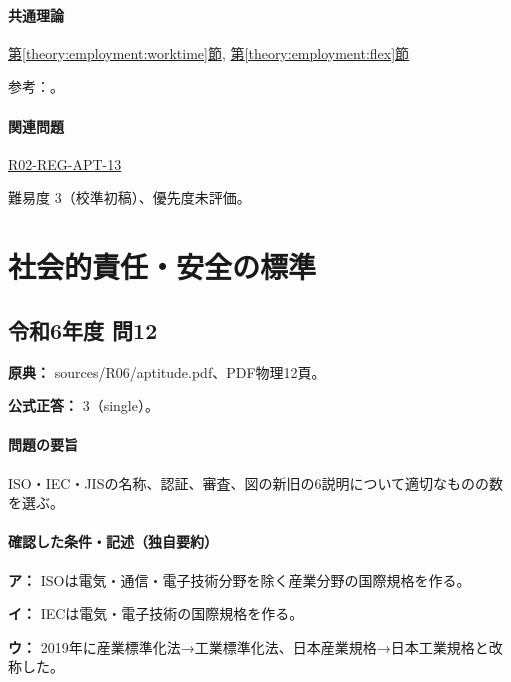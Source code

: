 \paragraph{共通理論} \hyperref[theory:employment:worktime]{第\ref*{theory:employment:worktime}節}, \hyperref[theory:employment:flex]{第\ref*{theory:employment:flex}節}

\par 参考：\cite{employment_hours2017,employment_manager2008,employment_reform2018,employment_worklife2010}。

\paragraph{関連問題} \hyperref[q:r02-reg-apt-13]{R02-REG-APT-13}

\par 難易度 3（校準初稿）、優先度未評価。

\section{社会的責任・安全の標準}

\subsection{令和6年度 問12}
\label{q:r06-reg-apt-12}

\noindent\textbf{原典：} sources/R06/aptitude.pdf、PDF物理12頁。

\textbf{公式正答：} 3（single）。

\paragraph{問題の要旨} ISO・IEC・JISの名称、認証、審査、図の新旧の6説明について適切なものの数を選ぶ。

\paragraph{確認した条件・記述（独自要約）}\mbox{}\par

\noindent\textbf{ア：} ISOは電気・通信・電子技術分野を除く産業分野の国際規格を作る。\par

\noindent\textbf{イ：} IECは電気・電子技術の国際規格を作る。\par

\noindent\textbf{ウ：} 2019年に産業標準化法→工業標準化法、日本産業規格→日本工業規格と改称した。\par

